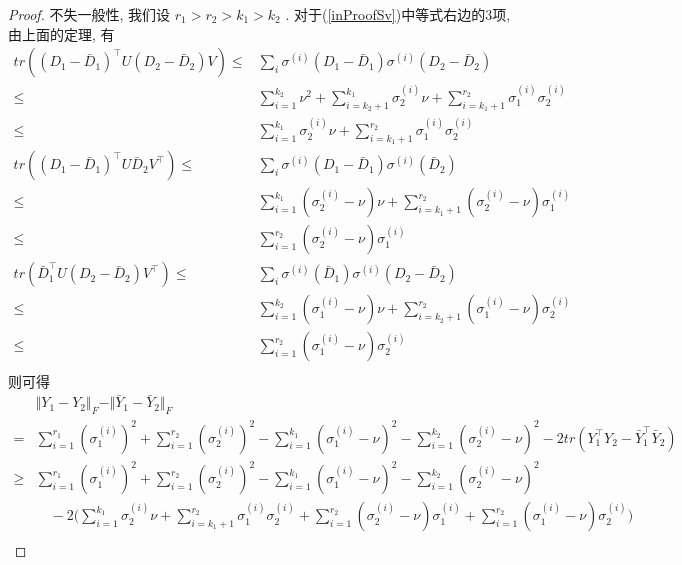 \documentclass[a4paper, UTF8]{ctexart}				%
\numberwithin{equation}{section}				%
\begin{document}
\begin{proof}
					不失一般性, 我们设 $r_1 > r_2 > k_1 > k_2$ . 对于(\ref{inProofSv})中等式右边的3项, 由上面的定理, 有
					\begin{equation}
						\begin{split}
							tr((D_1 - \bar{D}_1)^\top U (D_2 - \bar{D}_2)V)
						\le	& \sum^{ }_{i} \sigma^{(i)}(D_1 - \bar{D}_1) \sigma^{(i)}(D_2 - \bar{D}_2)\\
						\le	& \sum^{k_2}_{i = 1} \nu^2 + \sum^{k_1}_{i = k_2 + 1} \sigma_2^{(i)} \nu + \sum^{r_2}_{i = k_1 + 1} \sigma_1^{(i)} \sigma_2^{(i)}\\
						\le	& \sum^{k_1}_{i = 1} \sigma_2^{(i)} \nu + \sum^{r_2}_{i = k_1 + 1} \sigma_1^{(i)} \sigma_2^{(i)}\\
							tr((D_1 - \bar{D}_1)^\top U \bar{D}_2 V ^\top)
						\le & \sum^{ }_{i} \sigma^{(i)}(D_1 - \bar{D}_1) \sigma^{(i)}(\bar{D}_2)\\
						\le	& \sum^{k_1}_{i = 1} (\sigma_2^{(i)} - \nu)\nu + \sum^{r_2}_{i = k_1 + 1} (\sigma_2^{(i)} - \nu)\sigma_1^{(i)}\\
						\le	& \sum^{r_2}_{i = 1} (\sigma_2^{(i)} - \nu)\sigma_1^{(i)}\\
							tr(\bar{D}_1^\top U (D_2 - \bar{D}_2) V ^\top)
						\le & \sum^{ }_{i} \sigma^{(i)}(\bar{D}_1) \sigma^{(i)}(D_2 - \bar{D}_2)\\
						\le	& \sum^{k_2}_{i = 1} (\sigma_1^{(i)} - \nu)\nu + \sum^{r_2}_{i = k_2 + 1} (\sigma_1^{(i)} - \nu)\sigma_2^{(i)}\\
						\le	& \sum^{r_2}_{i = 1} (\sigma_1^{(i)} - \nu)\sigma_2^{(i)}\\
						\end{split}
					\end{equation}
					则可得
					\begin{equation}
						\begin{split}
								& \Vert{Y_1 - Y_2}\Vert_F - \Vert{\bar{Y}_1 - \bar{Y}_2}\Vert_F\\
							=	& \sum^{r_1}_{i = 1}(\sigma_1^{(i)})^2 + \sum^{r_2}_{i = 1}(\sigma_2^{(i)})^2 - \sum^{k_1}_{i = 1}(\sigma_1^{(i)} - \nu)^2 - \sum^{k_2}_{i = 1}(\sigma_2^{(i)} - \nu)^2 - 2tr(Y_1 ^\top Y_2 - \bar{Y}_1 ^\top \bar{Y}_2)\\
							\ge	& \sum^{r_1}_{i = 1}(\sigma_1^{(i)})^2 + \sum^{r_2}_{i = 1}(\sigma_2^{(i)})^2 - \sum^{k_1}_{i = 1}(\sigma_1^{(i)} - \nu)^2 - \sum^{k_2}_{i = 1}(\sigma_2^{(i)} - \nu)^2\\
								& \quad - 2 \Big(\sum^{k_1}_{i = 1} \sigma_2^{(i)} \nu + \sum^{r_2}_{i = k_1 + 1} \sigma_1^{(i)} \sigma_2^{(i)} + \sum^{r_2}_{i = 1} (\sigma_2^{(i)} - \nu)\sigma_1^{(i)} + \sum^{r_2}_{i = 1} (\sigma_1^{(i)} - \nu)\sigma_2^{(i)} \Big)\\

\end{split}
\end{equation}
\end{proof}
\end{document}
